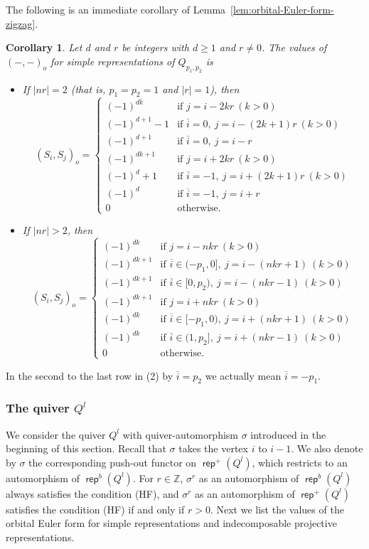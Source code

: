 \documentclass[reqno,12pt,a4paper]{amsart}
\newtheorem{corollary}[theorem]{Corollary}
\theoremstyle{remark}
\theoremstyle{definition}
\newcommand{\opname}[1]{\operatorname{\mathsf{#1}}}
\newcommand{\rep}{\opname{rep}\nolimits}
\numberwithin{equation}{section}
\begin{document}
The following is an immediate corollary of Lemma~\ref{lem:orbital-Euler-form-zigzag}.
\begin{corollary}
\label{cor:antisymmetric-orbital-Euler-form-zigzag}
Let $d$ and $r$ be integers with $d\geq 1$ and $r\neq 0$.
The values of $(-,-)_o$ for simple representations of $Q_{p_1,p_2}$ is
\begin{itemize}
\item[(1)] If $|nr|=2$ (that is, $p_1=p_2=1$ and $|r|=1$), then
    \[
    (S_i,S_j)_o=\begin{cases}
    (-1)^{dk} & \text{if }j=i-2kr~(k>0)\\
    (-1)^{d+1}-1 & \text{if } \overline{i}=0,~j=i-(2k+1)r~(k>0)\\
    (-1)^{d+1}& \text{if } \overline{i}=0,~j=i-r\\
    (-1)^{dk+1} & \text{if }j=i+2kr~(k>0)\\
    (-1)^d+1 & \text{if } \overline{i}=-1,~j=i+(2k+1)r~(k>0)\\
    (-1)^{d}& \text{if } \overline{i}=-1,~j=i+r\\
    0 & \text{otherwise}.
    \end{cases}
    \]
\item[(2)] If $|nr|>2$, then
    \[
    (S_i,S_j)_o=\begin{cases}
    (-1)^{dk} & \text{if }j=i-nkr~(k>0)\\
    (-1)^{dk+1} & \text{if } \overline{i}\in(-p_1,0],~j=i-(nkr+1)~(k>0)\\
    (-1)^{dk+1} & \text{if } \overline{i}\in [0,p_2),~j=i-(nkr-1)~(k>0)\\
    (-1)^{dk+1} & \text{if }j=i+nkr~(k>0)\\
    (-1)^{dk} & \text{if } \overline{i}\in[-p_1,0),~j=i+(nkr+1)~(k>0)\\
    (-1)^{dk} & \text{if } \overline{i}\in (1,p_2],~j=i+(nkr-1)~(k>0)\\
    0 & \text{otherwise} .
    \end{cases}
    \]
\end{itemize}
\end{corollary}
In the second to the last row in (2) by $\overline{i}=p_2$ we actually mean $\overline{i}=-p_1$.


\subsubsection{The quiver $Q^l$}
\label{ss:orbit-Euler-form-linear}

We consider the quiver $Q^l$ with quiver-automorphism $\sigma$ introduced in the beginning of this section. Recall that $\sigma$ takes the vertex $i$ to $i-1$. We also denote by $\sigma$ the corresponding push-out functor on $\rep^+(Q^l)$, which restricts to an automorphism of $\rep^b(Q^l)$. For $r\in\mathbb{Z}$, $\sigma^r$ as an automorphism of $\rep^b(Q^l)$ always satisfies the condition (HF), and $\sigma^r$ as an automorphism of $\rep^+(Q^l)$ satisfies the condition (HF) if and only if $r>0$. Next we list the values of the orbital Euler form for simple representations and indecomposable projective representations.
\end{document}
